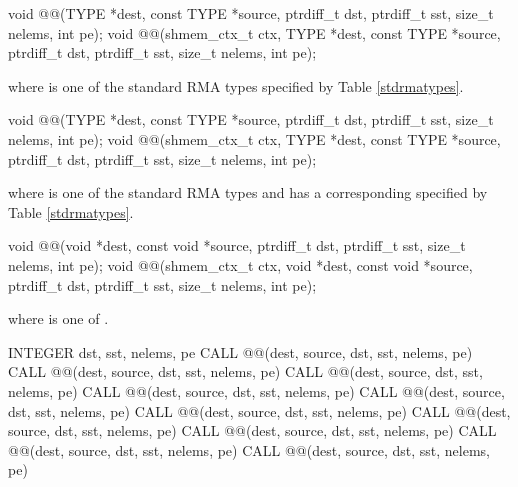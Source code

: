 
\begin{apidefinition}

\begin{C11synopsis}
void @@(TYPE *dest, const TYPE *source, ptrdiff_t dst, ptrdiff_t sst, size_t nelems, int pe);
void @@(shmem_ctx_t ctx, TYPE *dest, const TYPE *source, ptrdiff_t dst, ptrdiff_t sst, size_t nelems, int pe);
\end{C11synopsis}
where \TYPE{} is one of the standard \ac{RMA} types specified by Table \ref{stdrmatypes}.

\begin{Csynopsis}
void @@(TYPE *dest, const TYPE *source, ptrdiff_t dst, ptrdiff_t sst, size_t nelems, int pe);
void @@(shmem_ctx_t ctx, TYPE *dest, const TYPE *source, ptrdiff_t dst, ptrdiff_t sst, size_t nelems, int pe);
\end{Csynopsis}
where \TYPE{} is one of the standard \ac{RMA} types and has a corresponding \TYPENAME{} specified by Table \ref{stdrmatypes}.

\begin{CsynopsisCol}
void @@(void *dest, const void *source, ptrdiff_t dst, ptrdiff_t sst, size_t nelems, int pe);
void @@(shmem_ctx_t ctx, void *dest, const void *source, ptrdiff_t dst, ptrdiff_t sst, size_t nelems, int pe);
\end{CsynopsisCol}
where \SIZE{} is one of .

\begin{Fsynopsis}
INTEGER dst, sst, nelems, pe
CALL @@(dest, source, dst, sst, nelems, pe)
CALL @@(dest, source, dst, sst, nelems, pe)
CALL @@(dest, source, dst, sst, nelems, pe)
CALL @@(dest, source, dst, sst, nelems, pe)
CALL @@(dest, source, dst, sst, nelems, pe)
CALL @@(dest, source, dst, sst, nelems, pe)
CALL @@(dest, source, dst, sst, nelems, pe)
CALL @@(dest, source, dst, sst, nelems, pe)
CALL @@(dest, source, dst, sst, nelems, pe)
CALL @@(dest, source, dst, sst, nelems, pe)
\end{Fsynopsis}


\end{apidefinition}
